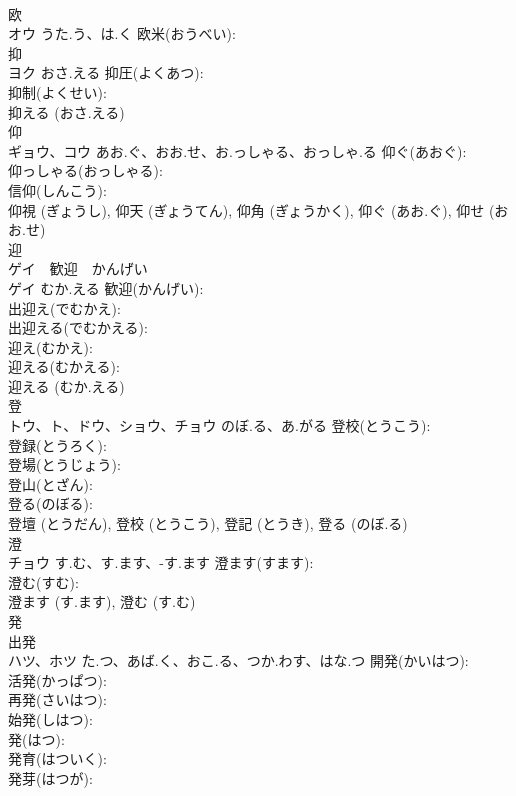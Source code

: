 \documentclass[8pt]{extreport}
\begin{document}
\begin{CJK}{UTF8}{min}
\\	欧			
\\	オウ	うた.う、は.く	欧米(おうべい): 
\\	抑			
\\	ヨク	おさ.える	抑圧(よくあつ): 
\\	抑制(よくせい): 
\\	抑える (おさ.える)
\\	仰			
\\	ギョウ、コウ	あお.ぐ、おお.せ、お.っしゃる、おっしゃ.る	仰ぐ(あおぐ): 
\\	仰っしゃる(おっしゃる): 
\\	信仰(しんこう): 
\\	仰視 (ぎょうし), 仰天 (ぎょうてん), 仰角 (ぎょうかく), 仰ぐ (あお.ぐ), 仰せ (おお.せ)
\\	迎			
\\	ゲイ　歓迎　かんげい
\\	ゲイ	むか.える	歓迎(かんげい): 
\\	出迎え(でむかえ): 
\\	出迎える(でむかえる): 
\\	迎え(むかえ): 
\\	迎える(むかえる): 
\\	迎える (むか.える)
\\	登			
\\	トウ、ト、ドウ、ショウ、チョウ	のぼ.る、あ.がる	登校(とうこう): 
\\	登録(とうろく): 
\\	登場(とうじょう): 
\\	登山(とざん): 
\\	登る(のぼる): 
\\	登壇 (とうだん), 登校 (とうこう), 登記 (とうき), 登る (のぼ.る)
\\	澄			
\\	チョウ	す.む、す.ます、-す.ます	澄ます(すます): 
\\	澄む(すむ): 
\\	澄ます (す.ます), 澄む (す.む)
\\	発			
\\	出発　
\\	ハツ、ホツ	た.つ、あば.く、おこ.る、つか.わす、はな.つ	開発(かいはつ): 
\\	活発(かっぱつ): 
\\	再発(さいはつ): 
\\	始発(しはつ): 
\\	発(はつ): 
\\	発育(はついく): 
\\	発芽(はつが): 

\end{CJK}
\end{document}

